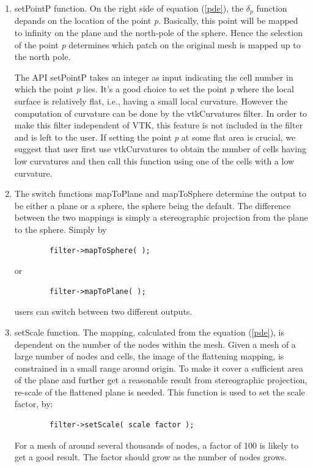 \documentclass{InsightArticle}
\begin{document}
	\begin{enumerate}
	\item setPointP function. On the right side of equation (\ref{pde}),
	the $\delta_p$ function depands on the location of the point
	\emph{p}. Basically, this point will be mapped to infinity on the
	plane and the north-pole of the sphere. Hence the selection of the
	point \emph{p} determines which patch on the original mesh is mapped
	up to the north pole.

	The API setPointP takes an integer as input indicating the cell
	number in which the point \emph{p} lies. It's a good choice to set
	the point \emph{p} where the local surface is relatively flat, i.e.,
	having a small local curvature. However the computation of curvature
	can be done by the vtkCurvatures filter. In order to make this
	filter independent of VTK, this feature is not included in the
	filter and is left to the user. If setting the point \emph{p} at
	some flat area is crucial, we suggest that user first use
	vtkCurvatures to obtain the number of cells having low curvatures
	and then call this function using one of the cells with a low
	curvature.

	\item The switch functions mapToPlane and mapToSphere determine the
	output to be either a plane or a sphere, the sphere being the
	default. The difference between the two mappings is simply a
	stereographic projection from the plane to the sphere. Simply by
	\begin{verbatim}
		filter->mapToSphere( ); 
	\end{verbatim}
	or
	\begin{verbatim}
		filter->mapToPlane( ); 
	\end{verbatim}
	users can switch between two different outputs.
	
	\item setScale function. The mapping, calculated from the equation
	(\ref{pde}), is dependent on the number of the nodes within the
	mesh. Given a mesh of a large number of nodes and cells, the image
	of the flattening mapping, is constrained in a small range around
	origin. To make it cover a sufficient area of the plane and further
	get a reasonable result from stereographic projection, re-scale of
	the flattened plane is needed. This function is used to set the
	scale factor, by:
	\begin{verbatim}
		filter->setScale( scale factor ); 
	\end{verbatim}
	For a mesh of around several thousands of nodes, a factor of 100 is likely to get a 
	good result. The factor should grow as the number of nodes grows.	
	\end{enumerate}
\end{document}
